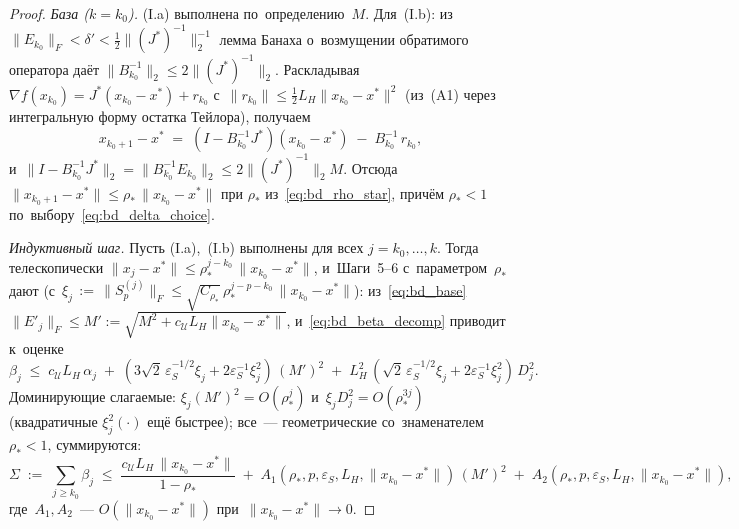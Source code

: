 \begin{proof}
\textit{База ($k=k_0$).} (I.a) выполнена по~определению~$M$. Для~(I.b):
из~$\|E_{k_0}\|_F<\delta'<\tfrac12\|(J^{*})^{-1}\|_2^{-1}$ лемма Банаха
о~возмущении обратимого оператора даёт $\|B_{k_0}^{-1}\|_2\le 2\|(J^{*})^{-1}\|_2$.
Раскладывая $\nabla f(x_{k_0}) = J^{*}(x_{k_0}-x^{*}) + r_{k_0}$ с~$\|r_{k_0}\|\le\tfrac12 L_H\|x_{k_0}-x^{*}\|^2$
(из~(A1) через интегральную форму остатка Тейлора), получаем
\[
  x_{k_0+1}-x^{*}
  \;=\; (I - B_{k_0}^{-1}J^{*})(x_{k_0}-x^{*})
        \;-\; B_{k_0}^{-1}\,r_{k_0},
\]
и~$\|I - B_{k_0}^{-1}J^{*}\|_2 = \|B_{k_0}^{-1}E_{k_0}\|_2 \le 2\|(J^{*})^{-1}\|_2 M$.
Отсюда $\|x_{k_0+1}-x^{*}\|\le\rho_*\,\|x_{k_0}-x^{*}\|$ при $\rho_*$ из~\eqref{eq:bd_rho_star},
причём $\rho_*<1$ по~выбору~\eqref{eq:bd_delta_choice}.

\textit{Индуктивный шаг.} Пусть (I.a),~(I.b) выполнены для всех $j=k_0,\dots,k$.
Тогда телескопически $\|x_j-x^{*}\|\le\rho_*^{j-k_0}\,\|x_{k_0}-x^{*}\|$, и~Шаги~5--6
с~параметром~$\rho_*$ дают (с~$\xi_j\,:=\,\|S_p^{(j)}\|_F\le\sqrt{C_{\rho_*}}\,\rho_*^{j-p-k_0}\,\|x_{k_0}-x^{*}\|$):
из~\eqref{eq:bd_base} $\|E'_j\|_F\le M':=\sqrt{M^2+c_{\mathcal{U}}L_H\|x_{k_0}-x^{*}\|}$,
и~\eqref{eq:bd_beta_decomp} приводит к~оценке
\[
  \beta_j
   \;\le\; c_{\mathcal{U}}L_H\,\alpha_j
        \;+\; (3\sqrt{2}\,\varepsilon_S^{-1/2}\xi_j + 2\varepsilon_S^{-1}\xi_j^2)\,(M')^2
        \;+\; L_H^2\,(\sqrt{2}\,\varepsilon_S^{-1/2}\xi_j + 2\varepsilon_S^{-1}\xi_j^2)\,D_j^2.
\]
Доминирующие слагаемые: $\xi_j (M')^2 = O(\rho_*^{j})$ и~$\xi_j D_j^2 = O(\rho_*^{3j})$
(квадратичные $\xi_j^2(\cdot)$ ещё быстрее); все~--- геометрические со~знаменателем $\rho_*<1$,
суммируются:
\begin{equation}\label{eq:bd_Sigma}
  \Sigma
  \;:=\; \sum_{j\ge k_0}\beta_j
  \;\le\; \frac{c_{\mathcal{U}}L_H\,\|x_{k_0}-x^{*}\|}{1-\rho_*}
       \;+\; A_1(\rho_*,p,\varepsilon_S,L_H,\|x_{k_0}-x^{*}\|)\,(M')^2
       \;+\; A_2(\rho_*,p,\varepsilon_S,L_H,\|x_{k_0}-x^{*}\|),
\end{equation}
где~$A_1,A_2$~--- $O(\|x_{k_0}-x^{*}\|)$ при~$\|x_{k_0}-x^{*}\|\to 0$.


\end{proof}
